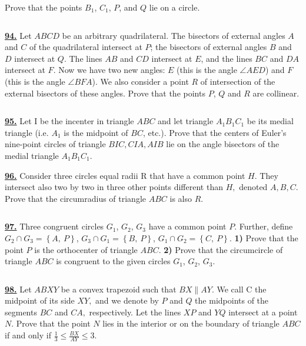 \documentclass{article}
\begin{document}
Prove that the points $B_{1}$, $C_{1}$, $P$, and $Q$ lie on a circle.

$$ $$


\href{ http://www.artofproblemsolving.com/Forum/viewtopic.php?p=191489#p191489
}{\bf 94.} Let $ABCD$ be an arbitrary quadrilateral. The bisectors of external angles $A$ and $C$ of the quadrilateral intersect at $P$; the bisectors of external angles $B$ and $D$ intersect at $Q$. The lines $AB$ and $CD$ intersect at $E$, and the lines $BC$ and $DA$ intersect at $F$. Now we have two new angles: $E$ (this is the angle $\angle{AED}$) and $F$ (this is the angle $\angle{BFA}$). We also consider a point $R$ of intersection of the external bisectors of these angles. Prove that the points $P$, $Q$ and $R$ are collinear.

$$ $$


\href{http://www.artofproblemsolving.com/Forum/viewtopic.php?p=190783#p190783
 }{\bf 95.} Let I be the incenter in triangle $ABC$ and let triangle $A_1B_1C_1$ be its medial triangle (i.e. $A_1$ is the midpoint of $BC$, etc.).  Prove that the centers of Euler's nine-point circles of triangle $BIC, CIA, AIB$ lie on the angle bisectors of the medial triangle $A_1B_1C_1$.



\href{http://www.artofproblemsolving.com/Forum/viewtopic.php?p=190783#p190783
 }{\bf 96.} Consider three circles equal radii R that have a common point $H.$  They intersect also two by two in three other points different than $H,$ denoted $A, B, C.$  Prove that the circumradius of triangle $ABC$ is also $R.$

$$ $$


\href{ http://www.artofproblemsolving.com/Forum/viewtopic.php?p=6461#p6461
}{\bf 97.} Three congruent circles $G_{1}$, $G_{2}$, $G_{3}$ have a common point $P$.
Further, define $G_{2}\cap G_{3}=\left\{A,\ P\right\}$, $G_{3}\cap G_{1}=\left\{B,\ P\right\}$, $G_{1}\cap G_{2}=\left\{C,\ P\right\}$.
{\bf 1)}  Prove that the point $P$ is the orthocenter of triangle $ABC$.
{\bf 2)}  Prove that the circumcircle of triangle $ABC$ is congruent to the given circles $G_{1}$, $G_{2}$, $G_{3}$.


$$ $$

\href{http://www.artofproblemsolving.com/Forum/viewtopic.php?p=235599#p235599
 }{\bf 98.} Let $ABXY$ be a convex trapezoid such that $BX \parallel AY.$ We call C the midpoint of its side $XY,$ and we denote by $P$ and $Q$ the midpoints of the segments $BC$ and $CA,$ respectively. Let the lines $XP$ and $YQ$ intersect at a point $N.$ Prove that the point $N$ lies in the interior or on the boundary of triangle $ ABC $ if and only if $\frac13\leq\frac{BX}{AY}\leq 3$.
\end{document}
